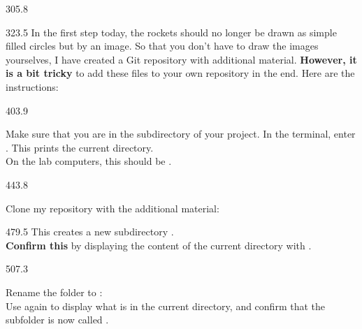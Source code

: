 \documentclass{aslab}
\begin{document}
\begin{region}{305.8}
\end{region}

\begin{region}[pitch=13.45]{323.5}
In the first step today, the rockets should no longer be drawn as simple
filled circles but by an image. So that you don't have to draw the images
yourselves, I have created a Git repository with additional material.
\textbf{However, it is a bit tricky} to add these files to your own
repository in the end. Here are the instructions:
\end{region}

\begin{region}[pitch=13.3]{403.9}
\begin{tasks}
\item Make sure that you are in the subdirectory of your project. In the
  terminal, enter . This prints the current directory.\\
  On the lab computers, this should be .
\end{tasks}
\end{region}

\begin{region}[pitch=17.8]{443.8}
\begin{tasks}[start=2]
\item Clone my repository with the additional material:\\
\end{tasks}
\end{region}

\begin{region}[x=74.7,right=0,pitch=14.2]{479.5}
This creates a new subdirectory .\\
\textbf{Confirm this} by displaying the content of the current directory with
.
\end{region}

\begin{region}[pitch=13.5]{507.3}
\begin{tasks}[start=3]
\item Rename the folder to : \\
  Use  again to display what is in the current directory, and
  confirm that the subfolder is now called .
\end{tasks}
\end{region}
\end{document}
